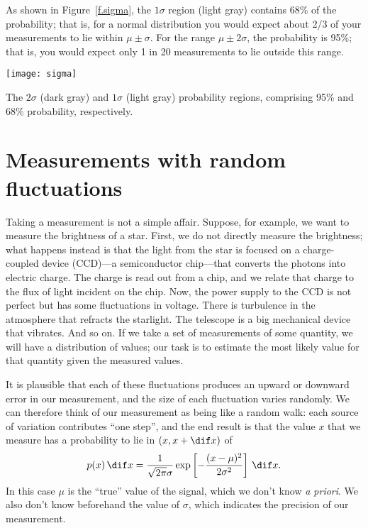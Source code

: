 As shown in Figure~\ref{f.sigma}, the $1\sigma$ region (light gray) contains 68\% of the probability; that is, for a normal distribution you would expect about 2/3 of your measurements to lie within $\mu \pm \sigma$.  For the range $\mu \pm 2\sigma$, the probability is 95\%; that is, you would expect only 1 in 20 measurements to lie outside this range.

\begin{marginfigure}
\texttt{[image: sigma]}
\caption[Proability regions for one and two standard deviations]{The $2\sigma$ (dark gray) and $1\sigma$ (light gray) probability regions, comprising 95\% and 68\% probability, respectively.}
\label{f.sigma}
\end{marginfigure}


\section{Measurements with random fluctuations}

Taking a measurement is not a simple affair.  Suppose, for example, we want to measure the brightness of a star.  First, we do not directly measure the brightness; what happens instead is that the light from the star is focused on a charge-coupled device (CCD)---a semiconductor chip---that converts the photons into electric charge.  The charge is read out from a chip, and we relate that charge to the flux of light incident on the chip.  Now, the power supply to the CCD is not perfect but has some fluctuations in voltage.  There is turbulence in the atmosphere that refracts the starlight. The telescope is a big mechanical device that vibrates. And so on. If we take a set of measurements of some quantity, we will have a distribution of values; our task is to estimate the most likely value for that quantity given the measured values.

It is plausible that each of these fluctuations produces an upward or downward error in our measurement, and the size of each fluctuation varies randomly.  We can therefore think of our measurement as being like a random walk: each source of variation contributes ``one step'', and the end result is that the value $x$ that we measure has a probability to lie in $(x,x+\dif x)$ of
\[ p(x)\,\dif x = \frac{1}{\sqrt{2\pi}\sigma}\exp\left[-\frac{(x-\mu)^{2}}{2\sigma^{2}}\right]\,\dif x. \]
In this case $\mu$ is the ``true'' value of the signal, which we don't know \emph{a priori}.  We also don't know beforehand the value of $\sigma$, which indicates the precision of our measurement.

